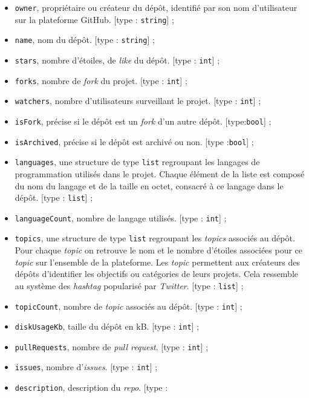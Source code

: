 \documentclass[
]{article}
\begin{document}
\begin{itemize}
\item
  \texttt{owner}, propriétaire ou créateur du dépôt, identifié par son
  nom d'utilisateur sur la plateforme GitHub. {[}type :
  \texttt{string}{]} ;
\item
  \texttt{name}, nom du dépôt. {[}type : \texttt{string}{]} ;
\item
  \texttt{stars}, nombre d'étoiles, de \emph{like} du dépôt. {[}type :
  \texttt{int}{]} ;
\item
  \texttt{forks}, nombre de \emph{fork} du projet. {[}type :
  \texttt{int}{]} ;
\item
  \texttt{watchers}, nombre d'utilisateurs surveillant le projet.
  {[}type : \texttt{int}{]} ;
\item
  \texttt{isFork}, précise si le dépôt est un \emph{fork} d'un autre
  dépôt. {[}type:\texttt{bool}{]} ;
\item
  \texttt{isArchived}, précise si le dépôt est archivé ou non. {[}type
  :\texttt{bool}{]} ;
\item
  \texttt{languages}, une structure de type \texttt{list} regroupant les
  langages de programmation utilisés dans le projet. Chaque élément de
  la liste est composé du nom du langage et de la taille en octet,
  consacré à ce langage dans le dépôt. {[}type : \texttt{list}{]} ;
\item
  \texttt{languageCount}, nombre de langage utilisés. {[}type :
  \texttt{int}{]} ;
\item
  \texttt{topics}, une structure de type \texttt{list} regroupant les
  \emph{topics} associés au dépôt. Pour chaque \emph{topic} on retrouve
  le nom et le nombre d'étoiles associées pour ce \emph{topic} sur
  l'ensemble de la plateforme. Les \emph{topic} permettent aux créateurs
  des dépôts d'identifier les objectifs ou catégories de leurs projets.
  Cela ressemble au système des \emph{hashtag} popularisé par
  \emph{Twitter}. {[}type : \texttt{list}{]} ;
\item
  \texttt{topicCount}, nombre de \emph{topic} associés au dépôt. {[}type
  : \texttt{int}{]} ;
\item
  \texttt{diskUsageKb}, taille du dépôt en kB. {[}type : \texttt{int}{]}
  ;
\item
  \texttt{pullRequests}, nombre de \emph{pull request}. {[}type :
  \texttt{int}{]} ;
\item
  \texttt{issues}, nombre d'\emph{issues}. {[}type : \texttt{int}{]} ;
\item
  \texttt{description}, description du \emph{repo}. {[}type :

\end{itemize}
\end{document}
